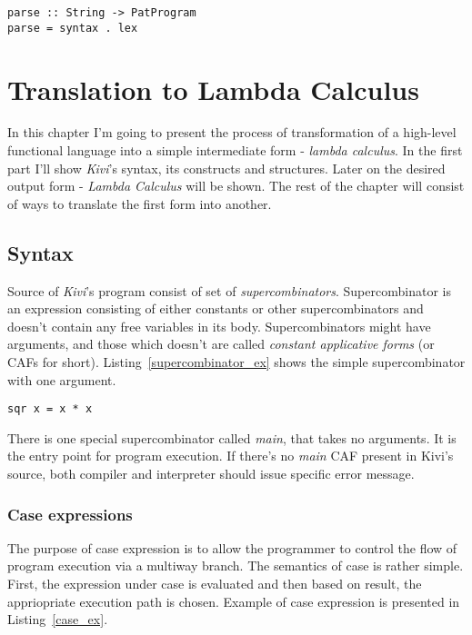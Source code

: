 \documentclass[a4paper]{report}
\begin{document}
\begin{verbatim}
parse :: String -> PatProgram
parse = syntax . lex
\end{verbatim}


\chapter{Translation to Lambda Calculus}

In this chapter I'm going to present the process of transformation of a
high-level functional language into a simple intermediate form - \textit{lambda
calculus}. In the first part I'll show \textit{Kivi}'s syntax, its
constructs and structures. Later on the desired output form -
\textit{Lambda Calculus} will be shown. The rest of the chapter will
consist of ways to translate the first form into another.

\section{Syntax}
Source of \textit{Kivi}'s program consist of set of
\textit{supercombinators}\cite{wiki:supercombinator}. Supercombinator is an
expression consisting of either constants or other supercombinators and
doesn't contain any free variables in its body. Supercombinators might have
arguments, and those which doesn't are called \textit{constant applicative forms}
(or CAFs for short). Listing~\ref{supercombinator_ex} shows the simple
supercombinator with one argument.

\begin{lstlisting}[label=supercombinator_ex,caption={Simple supercombinator.}]
  sqr x = x * x
\end{lstlisting}

There is one special supercombinator called \textit{main}, that takes no
arguments. It is the entry point for program execution. If there's no
\textit{main} CAF present in Kivi's source, both compiler and interpreter
should issue specific error message.

\subsection{Case expressions}
The purpose of case expression is to allow the programmer to control the flow
of program execution via a multiway branch. The semantics of case is rather
simple. First, the expression under case is evaluated and then based on result,
the appriopriate execution path is chosen. Example of case expression is
presented in Listing~\ref{case_ex}.
\end{document}
